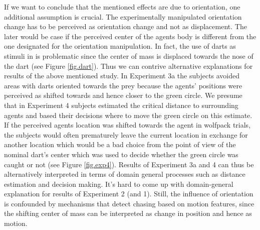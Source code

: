 \documentclass{article}
\begin{document}
If we want to conclude that the mentioned effects are due to orientation, one additional assumption is crucial. The experimentally manipulated orientation change has to be perceived as orientation change and not as displacement. The later would be case if the perceived center of the agents body is different from the one designated for the orientation manipulation. In fact, the use of darts as stimuli in \citet{gao10} is problematic since the center of mass is displaced towards the nose of the dart (see Figure \ref{fig.dart}). Thus we can contrive alternative explanations for results of the above mentioned study. In Experiment 3a the subjects avoided areas with darts oriented towards the prey because the agents' positions were perceived as shifted towards and hence closer to the green circle. We presume that in Experiment 4 subjects estimated the critical distance to surrounding agents and based their decisions where to move the green circle on this estimate. If the perceived agents location was shifted towards the agent in wolfpack trials, the subjects would often prematurely leave the current location in exchange for another location which would be a bad choice from the point of view of the nominal dart's center which was used to decide whether the green circle was caught or not (see Figure \ref{fig.exp4}). Results of Experiment 3a and 4 can thus be alternatively interpreted in terms of domain general processes such as distance estimation and decision making. It's hard to come up with domain-general explanation for results of Experiment 2 (and 1). Still, the influence of orientation is confounded by mechanisms that detect chasing based on motion features, since the shifting center of mass can be interpreted as change in position and hence as motion.\\
\end{document}
